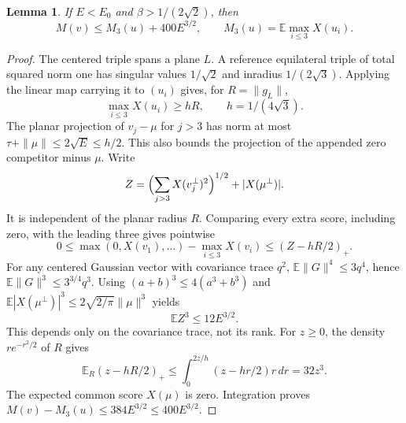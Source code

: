 \documentclass[11pt,reqno]{amsart}
\numberwithin{equation}{section}
\newtheorem{lemma}[theorem]{Lemma}
\theoremstyle{definition}
\theoremstyle{remark}
\newcommand{\E}{\mathbb E}
\begin{document}
\begin{lemma}\label{lem:activation}
If $E<E_0$ and $\beta>1/(2\sqrt2)$, then
\begin{equation}\label{eq:activation}
 M(v)\le M_3(u)+400E^{3/2},\qquad
 M_3(u)=\E\max_{i\le3}X(u_i).
\end{equation}
\end{lemma}
\begin{proof}
The centered triple spans a plane $L$. A reference equilateral triple
of total squared norm one has singular values $1/\sqrt2$ and
inradius $1/(2\sqrt3)$. Applying the linear map carrying it to
$(u_i)$ gives, for $R=\|g_L\|$,
\[
                    \max_{i\le3}X(u_i)\ge hR,\qquad h=1/(4\sqrt3).
\]
The planar projection of $v_j-\mu$ for $j>3$ has norm at most
$\tau+\|\mu\|\le2\sqrt E\le h/2$. This also bounds the projection
of the appended zero competitor minus $\mu$. Write
\[
 Z=\Bigl(\sum_{j>3}X(v_j^\perp)^2\Bigr)^{1/2}+|X(\mu^\perp)|.
\]
It is independent of the planar radius $R$. Comparing every extra
score, including zero, with the leading three gives pointwise
\[
 0\le\max(0,X(v_1),\ldots)-\max_{i\le3}X(v_i)
                                  \le(Z-hR/2)_+.
\]
For any centered Gaussian vector with covariance trace $q^2$,
$\E\|G\|^4\le3q^4$, hence $\E\|G\|^3\le3^{3/4}q^3$.
Using $(a+b)^3\le4(a^3+b^3)$ and
$\E|X(\mu^\perp)|^3\le2\sqrt{2/\pi}\|\mu\|^3$ yields
\[
                            \E Z^3\le12E^{3/2}.
\]
This depends only on the covariance trace, not its rank.
For $z\ge0$, the density $r e^{-r^2/2}$ of $R$ gives
\[
 \E_R(z-hR/2)_+\le\int_0^{2z/h}(z-hr/2)r\,dr=32z^3.
\]
The expected common score $X(\mu)$ is zero. Integration proves
$M(v)-M_3(u)\le384E^{3/2}\le400E^{3/2}$.
\end{proof}
\end{document}
